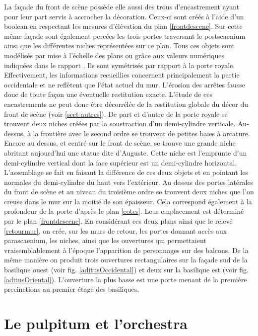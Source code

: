 La façade du front de scène possède elle aussi des trous d'encastrement ayant pour leur part servis à accrocher la décoration. Ceux-ci sont créés à l'aide d'un \gls{boolean} en respectant les mesures d'élévation du plan \ref{frontdescene}. Sur cette même façade sont également percées les trois portes traversant le \gls{postscaenium} ainsi que les différentes niches représentées sur ce plan. Tous ces objets sont modélisés par mise à l'échelle des plans \cite{orangePl} ou grâce aux valeurs numériques indiquées dans le rapport \cite[Chap. II]{orangeTxt}. Ils sont symétrisés par rapport à la porte royale. Effectivement, les informations recueillies concernent principalement la partie occidentale et ne reflètent que l'état actuel du mur. L'érosion des arrêtes fausse donc de toute façon une éventuelle restitution exacte. L'étude de ces encastrements ne peut donc être décorrélée de la restitution globale du décor du front de scène (voir \ref{sect-autres}). De part et d'autre de la porte royale se trouvent deux niches créées par la soustraction d'un demi-cylindre verticale. Au-dessus, à la frontière avec le second ordre se trouvent de petites baies à arcature. Encore au dessus, et centré sur le front de scène, se trouve une grande niche abritant aujourd'hui une statue dite d'Auguste. Cette niche est l'emprunte d'un demi-cylindre vertical dont la face supérieur est un demi-cylindre horizontal. L'assemblage se fait en faisant la différence de ces deux objets et en pointant les normales du demi-cylindre du haut vers l'extérieur. Au dessus des portes latérales du front de scène et au niveau du troisième ordre se trouvent deux niches que l'on creuse dans le mur sur la moitié de son épaisseur. Cela correspond également à la profondeur de la porte d'après le plan \ref{cotes}. Leur emplacement est déterminé par le plan \ref{frontdescene}. En considérant ces deux plans ainsi que le relevé \ref{retourmur}, on crée, sur les murs de retour, les portes donnant accès aux \gls{parascaenium}, les niches, ainsi que les ouvertures qui permettaient vraisemblablement à l'époque l'apparition de personnages sur des balcons. De la même manière on produit trois ouvertures rectangulaires sur la façade sud de la \gls{basilique} ouest (voir fig. \ref{aditusOccidental}) et deux sur la \gls{basilique} est (voir fig. \ref{aditusOriental}). L'ouverture la plus basse est une porte menant de la première \glspl{precinction} au premier étage des \glspl{basilique}.


\section{Le \gls{pulpitum} et l'\gls{orchestra}} 


